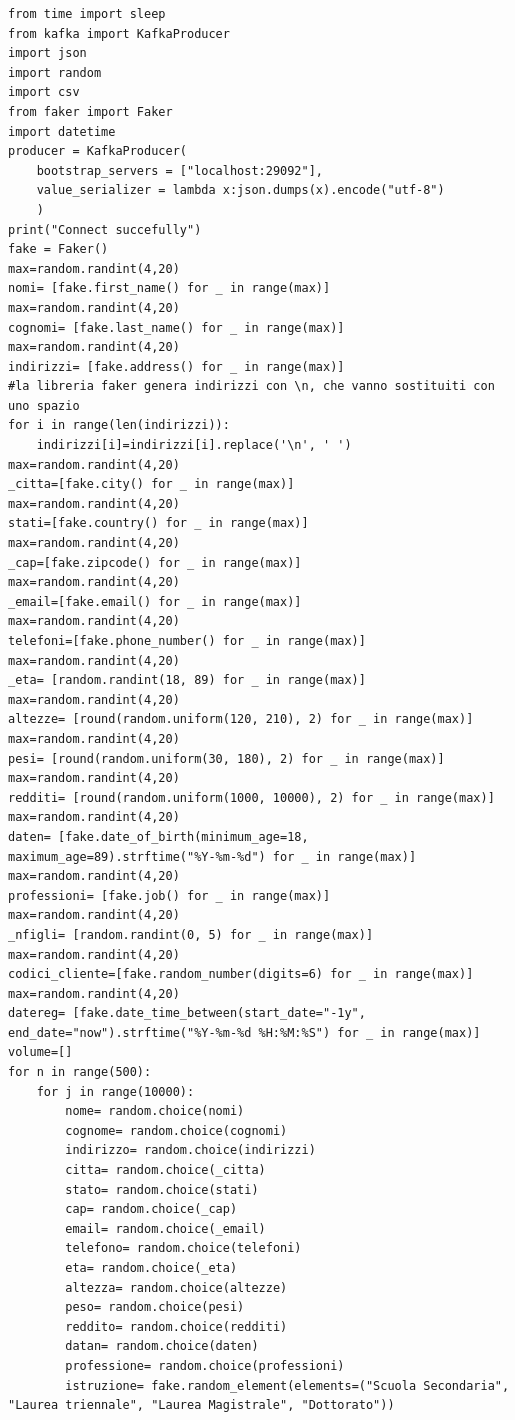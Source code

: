 \documentclass{article}
\begin{document}
\begin{lstlisting}
from time import sleep  
from kafka import KafkaProducer  
import json 
import random
import csv
from faker import Faker
import datetime
producer = KafkaProducer(  
    bootstrap_servers = ["localhost:29092"],  
    value_serializer = lambda x:json.dumps(x).encode("utf-8")  
    )  
print("Connect succefully") 
fake = Faker()
max=random.randint(4,20)
nomi= [fake.first_name() for _ in range(max)]
max=random.randint(4,20)
cognomi= [fake.last_name() for _ in range(max)]
max=random.randint(4,20)
indirizzi= [fake.address() for _ in range(max)]
#la libreria faker genera indirizzi con \n, che vanno sostituiti con uno spazio
for i in range(len(indirizzi)):
    indirizzi[i]=indirizzi[i].replace('\n', ' ')
max=random.randint(4,20)
_citta=[fake.city() for _ in range(max)]
max=random.randint(4,20)
stati=[fake.country() for _ in range(max)]
max=random.randint(4,20)
_cap=[fake.zipcode() for _ in range(max)]
max=random.randint(4,20)
_email=[fake.email() for _ in range(max)]
max=random.randint(4,20)
telefoni=[fake.phone_number() for _ in range(max)]
max=random.randint(4,20)
_eta= [random.randint(18, 89) for _ in range(max)]
max=random.randint(4,20)
altezze= [round(random.uniform(120, 210), 2) for _ in range(max)]
max=random.randint(4,20)
pesi= [round(random.uniform(30, 180), 2) for _ in range(max)]
max=random.randint(4,20)
redditi= [round(random.uniform(1000, 10000), 2) for _ in range(max)]
max=random.randint(4,20)
daten= [fake.date_of_birth(minimum_age=18, maximum_age=89).strftime("%Y-%m-%d") for _ in range(max)]
max=random.randint(4,20)
professioni= [fake.job() for _ in range(max)]
max=random.randint(4,20)
_nfigli= [random.randint(0, 5) for _ in range(max)]
max=random.randint(4,20)
codici_cliente=[fake.random_number(digits=6) for _ in range(max)]
max=random.randint(4,20)
datereg= [fake.date_time_between(start_date="-1y", end_date="now").strftime("%Y-%m-%d %H:%M:%S") for _ in range(max)]
volume=[]
for n in range(500):
    for j in range(10000):
        nome= random.choice(nomi)
        cognome= random.choice(cognomi)
        indirizzo= random.choice(indirizzi)
        citta= random.choice(_citta)
        stato= random.choice(stati)
        cap= random.choice(_cap)
        email= random.choice(_email)
        telefono= random.choice(telefoni)
        eta= random.choice(_eta)
        altezza= random.choice(altezze)
        peso= random.choice(pesi)
        reddito= random.choice(redditi)
        datan= random.choice(daten)
        professione= random.choice(professioni)
        istruzione= fake.random_element(elements=("Scuola Secondaria", "Laurea triennale", "Laurea Magistrale", "Dottorato"))

\end{lstlisting}
\end{document}
